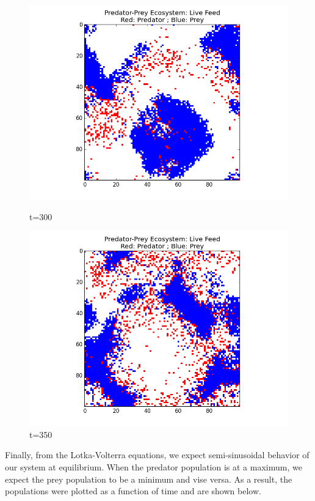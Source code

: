 \documentclass[a4paper,12pt]{article}
\begin{document}
  \begin{figure}[H]
  \centering        
	\begin{minipage}[b]{.45\linewidth} 
		 \includegraphics[width = 1\linewidth]{./pics/ecosystem_snapshot_300.png}  
                 \caption{t=300}
        \end{minipage}  
        \quad
	\begin{minipage}[b]{.45\linewidth}		 
		 \includegraphics[width = 1\linewidth]{./pics/ecosystem_snapshot_350.png} 
                 \caption{t=350}
        \end{minipage}  
  \end{figure}

Finally, from the Lotka-Volterra equations, we expect semi-sinusoidal behavior of our system at equilibrium.  When the predator population is at a maximum,
we expect the prey population to be a minimum and vise versa.  As a result, the populations were plotted as a function of time and are shown below.  
\end{document}
